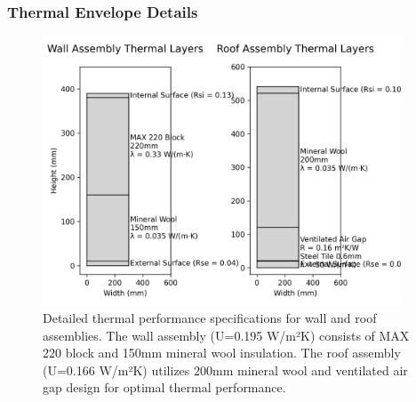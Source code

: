 \documentclass[12pt,a4paper]{article}
\begin{document}
\subsubsection{Thermal Envelope Details}
\begin{figure}[H]
    \centering
    \includegraphics[width=0.95\textwidth]{cad_project/enhanced_exports/screenshots/thermal_details.png}
    \caption{Detailed thermal performance specifications for wall and roof assemblies.
    The wall assembly (U=0.195 W/m²K) consists of MAX 220 block and 150mm mineral wool insulation.
    The roof assembly (U=0.166 W/m²K) utilizes 200mm mineral wool and ventilated air gap design for optimal thermal performance.}
    \label{fig:thermal_details}
\end{figure}
\end{document}
